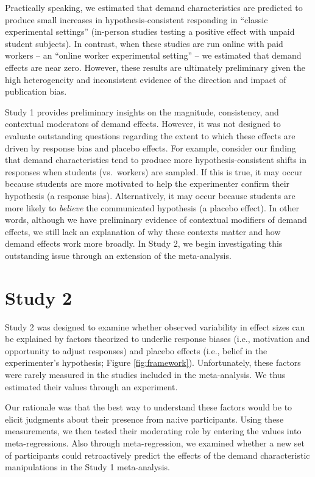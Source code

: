 \documentclass[
  man,floatsintext]{apa6}
\begin{document}
Practically speaking, we estimated that demand characteristics are predicted to produce small increases in hypothesis-consistent responding in ``classic experimental settings'' (in-person studies testing a positive effect with unpaid student subjects). In contrast, when these studies are run online with paid workers -- an ``online worker experimental setting'' -- we estimated that demand effects are near zero. However, these results are ultimately preliminary given the high heterogeneity and inconsistent evidence of the direction and impact of publication bias.

Study 1 provides preliminary insights on the magnitude, consistency, and contextual moderators of demand effects. However, it was not designed to evaluate outstanding questions regarding the extent to which these effects are driven by response bias and placebo effects. For example, consider our finding that demand characteristics tend to produce more hypothesis-consistent shifts in responses when students (vs.~workers) are sampled. If this is true, it may occur because students are more motivated to help the experimenter confirm their hypothesis (a response bias). Alternatively, it may occur because students are more likely to \emph{believe} the communicated hypothesis (a placebo effect). In other words, although we have preliminary evidence of contextual modifiers of demand effects, we still lack an explanation of why these contexts matter and how demand effects work more broadly. In Study 2, we begin investigating this outstanding issue through an extension of the meta-analysis.

\hypertarget{study-2}{%
\section{Study 2}\label{study-2}}

Study 2 was designed to examine whether observed variability in effect sizes can be explained by factors theorized to underlie response biases (i.e., motivation and opportunity to adjust responses) and placebo effects (i.e., belief in the experimenter's hypothesis; Figure \ref{fig:framework}). Unfortunately, these factors were rarely measured in the studies included in the meta-analysis. We thus estimated their values through an experiment.

Our rationale was that the best way to understand these factors would be to elicit judgments about their presence from na:ive participants. Using these measurements, we then tested their moderating role by entering the values into meta-regressions. Also through meta-regression, we examined whether a new set of participants could retroactively predict the effects of the demand characteristic manipulations in the Study 1 meta-analysis.
\end{document}
